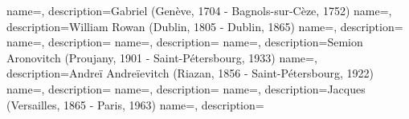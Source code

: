  {
    name=,
    description={Gabriel (Genève, 1704 - Bagnols-sur-Cèze, 1752)}
}
 {
    name=,
    description={William Rowan (Dublin, 1805 - Dublin, 1865)}
}
 {
    name=,
    description={}
}
 {
    name=,
    description={}
}
 {
    name=,
    description={}
}
 {
    name=,
    description={Semion Aronovitch (Proujany, 1901 - Saint-Pétersbourg, 1933)}
}
 {
    name=,
    description={Andreï Andreïevitch (Riazan, 1856 - Saint-Pétersbourg, 1922)}
}
 {
    name=,
    description={}
}
 {
    name=,
    description={}
}
 {
    name=,
    description={Jacques (Versailles, 1865 - Paris, 1963)}
}
 {
    name=,
    description={}
}

